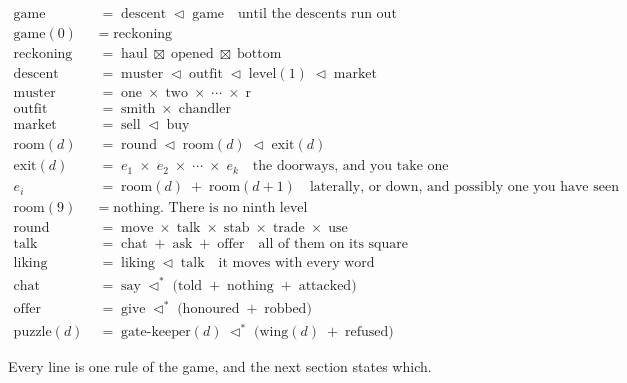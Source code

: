 \documentclass[11pt,a4paper]{article}
\newcommand{\seqb}{\lhd^{\ast}}
\begin{document}
\begin{align*}
\text{game}       \;&=\; \text{descent} \;\lhd\; \text{game} \quad\text{until the descents run out} \\[1.5mm]
\text{game}(0)    \;&=\; \text{reckoning} \\[1.5mm]
\text{reckoning}  \;&=\; \text{haul} \;\boxtimes\; \text{opened} \;\boxtimes\; \text{bottom} \\[3mm]
\text{descent}    \;&=\; \text{muster} \;\lhd\; \text{outfit} \;\lhd\; \text{level}(1) \;\lhd\; \text{market} \\[1.5mm]
\text{muster}     \;&=\; \text{one} \;\times\; \text{two} \;\times\; \cdots \;\times\; \text{r} \\[1.5mm]
\text{outfit}     \;&=\; \text{smith} \;\times\; \text{chandler} \\[1.5mm]
\text{market}     \;&=\; \text{sell} \;\lhd\; \text{buy} \\[3mm]
\text{room}(d)    \;&=\; \text{round} \;\lhd\; \text{room}(d) \;\lhd\; \text{exit}(d) \\[1.5mm]
\text{exit}(d)    \;&=\; e_1 \;\times\; e_2 \;\times\; \cdots \;\times\; e_k \quad\text{the doorways, and you take one} \\[1.5mm]
e_i               \;&=\; \text{room}(d) \;+\; \text{room}(d{+}1) \quad\text{laterally, or down, and possibly one you have seen} \\[1.5mm]
\text{room}(9)    \;&=\; \text{nothing. There is no ninth level} \\[3mm]
\text{round}      \;&=\; \text{move} \;\times\; \text{talk} \;\times\; \text{stab} \;\times\; \text{trade} \;\times\; \text{use} \\[1.5mm]
\text{talk}       \;&=\; \text{chat} \;+\; \text{ask} \;+\; \text{offer} \quad\text{all of them on its square} \\[1.5mm]
\text{liking}     \;&=\; \text{liking} \;\lhd\; \text{talk} \quad\text{it moves with every word} \\[3mm]
\text{chat}       \;&=\; \text{say} \;\seqb\; \bigl( \text{told} \;+\; \text{nothing} \;+\; \text{attacked} \bigr) \\[1.5mm]
\text{offer}      \;&=\; \text{give} \;\seqb\; \bigl( \text{honoured} \;+\; \text{robbed} \bigr) \\[1.5mm]
\text{puzzle}(d)  \;&=\; \text{gate-keeper}(d) \;\seqb\; \bigl( \text{wing}(d) \;+\; \text{refused} \bigr)
\end{align*}

Every line is one rule of the game, and the next section states which.
\end{document}
